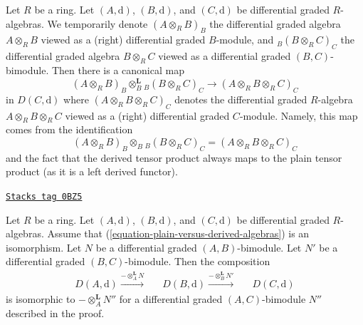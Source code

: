 Let $R$ be a ring. Let $(A, \text{d})$, $(B, \text{d})$, and
$(C, \text{d})$ be differential graded $R$-algebras.
We temporarily denote $(A \otimes_R B)_B$ the differential
graded algebra $A \otimes_R B$ viewed as a (right) differential
graded $B$-module, and ${}_B(B \otimes_R C)_C$ the differential
graded algebra $B \otimes_R C$ viewed as a differential graded
$(B, C)$-bimodule. Then there is a canonical map
\begin{equation}
\label{equation-plain-versus-derived-algebras}
(A \otimes_R B)_B \otimes_B^\mathbf{L} {}_B(B \otimes_R C)_C
\longrightarrow
(A \otimes_R B \otimes_R C)_C
\end{equation}
in $D(C, \text{d})$ where $(A \otimes_R B \otimes_R C)_C$
denotes the differential
graded $R$-algebra $A \otimes_R B \otimes_R C$ viewed as a
(right) differential graded $C$-module. Namely, this map
comes from the identification
$$
(A \otimes_R B)_B \otimes_B {}_B(B \otimes_R C)_C =
(A \otimes_R B \otimes_R C)_C
$$
and the fact that the derived tensor product always maps to the
plain tensor product (as it is a left derived functor).

\begin{lemma}
\label{dga-lemma-compose-tensor-functors-general-algebra}
\href{https://stacks.math.columbia.edu/tag/0BZ5}{\texttt{Stacks tag 0BZ5}}

Let $R$ be a ring. Let $(A, \text{d})$, $(B, \text{d})$, and
$(C, \text{d})$ be differential graded $R$-algebras. Assume
that (\ref{equation-plain-versus-derived-algebras}) is an isomorphism.
Let $N$ be a differential graded $(A, B)$-bimodule.
Let $N'$ be a differential graded $(B, C)$-bimodule.
Then the composition
$$
\begin{array}{ccccc}D(A, \text{d}) \overset{- \otimes_A^\mathbf{L} N}{\longrightarrow} &  & D(B, \text{d}) \overset{- \otimes_B^\mathbf{L} N'}{\longrightarrow} &  & D(C, \text{d})\end{array}
$$
is isomorphic to $- \otimes_A^\mathbf{L} N''$ for a differential graded
$(A, C)$-bimodule $N''$ described in the proof.
\end{lemma}

